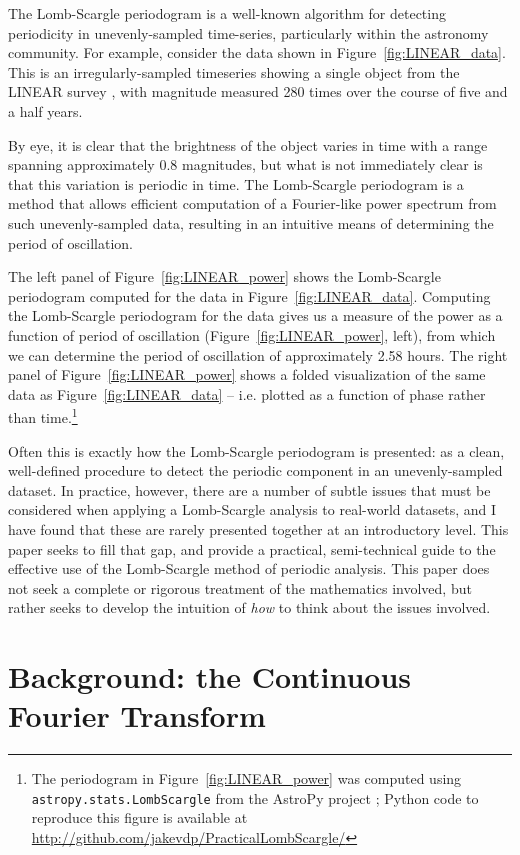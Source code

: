 \documentclass[preprint]{aastex}
\newcommand{\Fig}[1]{Figure~\ref{fig:#1}}
\newcommand{\fig}[1]{\Fig{#1}}
\begin{document}
The Lomb-Scargle periodogram \citep{Lomb76, Scargle82}
is a well-known algorithm for detecting periodicity
in unevenly-sampled time-series, particularly within the astronomy community.
For example, consider the data shown in \fig{LINEAR_data}.
This is an irregularly-sampled timeseries showing a single object from the
LINEAR survey \citep{LINEAR}, with magnitude measured 280 times over the course of five and
a half years.

By eye, it is clear that the brightness of the object varies in time with a range spanning approximately 0.8 magnitudes, but what is not immediately clear is that this variation is periodic in time.
The Lomb-Scargle periodogram is a method that allows efficient computation of a Fourier-like power spectrum from such unevenly-sampled data, resulting in an intuitive means of determining the period of oscillation.

The left panel of \fig{LINEAR_power} shows the Lomb-Scargle periodogram computed for the data in \fig{LINEAR_data}.
Computing the Lomb-Scargle periodogram for the data gives us a measure of the
power as a function of period of oscillation (\fig{LINEAR_power}, left), from
which we can determine the period of oscillation of approximately 2.58 hours.
The right panel of \fig{LINEAR_power} shows a folded visualization of
the same data as \fig{LINEAR_data} -- i.e.{} plotted as a function of phase
rather than time.\footnote{
    The periodogram in \fig{LINEAR_power} was computed using
    {\tt astropy.stats.LombScargle}
    from the AstroPy project \citep{Astropy2013};
    Python code to reproduce this figure is available at
    \url{http://github.com/jakevdp/PracticalLombScargle/}
}

Often this is exactly how the Lomb-Scargle periodogram is presented: as a clean, well-defined procedure to detect the periodic component in an unevenly-sampled dataset.
In practice, however, there are a number of subtle issues that must be considered when applying a Lomb-Scargle analysis to real-world datasets, and I have found that these are rarely presented together at an introductory level.
This paper seeks to fill that gap, and provide a practical, semi-technical guide to the effective use of the Lomb-Scargle method of periodic analysis.
This paper does not seek a complete or rigorous treatment of the mathematics involved, but rather seeks to develop the intuition of {\it how} to think about the issues involved.


\section{Background: the Continuous Fourier Transform}
\end{document}
